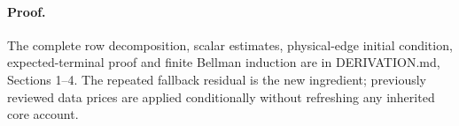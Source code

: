 \documentclass{article}
\begin{document}
\paragraph{Proof.} The complete row decomposition, scalar estimates,
physical-edge initial condition, expected-terminal proof and finite
Bellman induction are in DERIVATION.md, Sections 1--4. The repeated
fallback residual is the new ingredient; previously reviewed data prices
are applied conditionally without refreshing any inherited core account.
\end{document}
